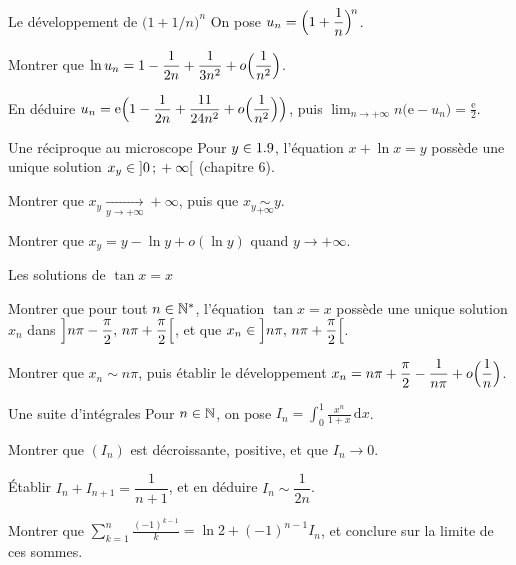 \begin{exercice}[2]{Le développement de $\bigl(1+1/n\bigr)^{n}$}
On pose $u_n=\Bigl(1+\dfrac1n\Bigr)^{\!n}$.
\begin{questions}
  \item Montrer que
    $\ln u_n=1-\dfrac{1}{2n}+\dfrac{1}{3n^{2}}+o\Bigl(\dfrac{1}{n^{2}}\Bigr)$.
  \item En déduire
    $u_n=\mathrm{e}\Bigl(1-\dfrac{1}{2n}+\dfrac{11}{24n^{2}}+o\Bigl(\dfrac{1}{n^{2}}\Bigr)\Bigr)$,
    puis $\displaystyle\lim_{n\to+\infty}n\bigl(\mathrm{e}-u_n\bigr)=\frac{\mathrm{e}}{2}$.
\end{questions}
\end{exercice}

\begin{exercice}[2]{Une réciproque au microscope}
Pour $y\in1.9$, l'équation $x+\ln x=y$ possède une unique solution
$x_y\in\mathopen{]}0\,{;}\,+\infty\mathclose{[}$ (chapitre 6).
\begin{questions}
  \item Montrer que $x_y\xrightarrow[y\to+\infty]{}+\infty$, puis que
    $x_y\underset{+\infty}{\sim}y$.
  \item Montrer que $x_y=y-\ln y+o(\ln y)$ quand $y\to+\infty$.
\end{questions}
\end{exercice}

\begin{exercice}[2]{Les solutions de $\tan x=x$}
\begin{questions}
  \item Montrer que pour tout $n\in\mathbb{N}^{*}$, l'équation $\tan x=x$ possède
    une unique solution $x_n$ dans
    $\Bigl]n\pi-\dfrac{\pi}{2},\,n\pi+\dfrac{\pi}{2}\Bigr[$, et que
    $x_n\in\Bigl]n\pi,\,n\pi+\dfrac{\pi}{2}\Bigr[$.
  \item Montrer que $x_n\sim n\pi$, puis établir le développement
    $x_n=n\pi+\dfrac{\pi}{2}-\dfrac{1}{n\pi}+o\Bigl(\dfrac1n\Bigr)$.
\end{questions}
\end{exercice}

\begin{exercice}[2]{Une suite d'intégrales}
Pour $n\in\mathbb{N}$, on pose $I_n=\displaystyle\int_{0}^{1}\frac{x^{n}}{1+x}\,\mathrm{d}x$.
\begin{questions}
  \item Montrer que $(I_n)$ est décroissante, positive, et que $I_n\to0$.
  \item Établir $I_n+I_{n+1}=\dfrac{1}{n+1}$, et en déduire
    $I_n\sim\dfrac{1}{2n}$.
  \item Montrer que
    $\displaystyle\sum_{k=1}^{n}\frac{(-1)^{k-1}}{k}=\ln2+(-1)^{n-1}I_n$,
    et conclure sur la limite de ces sommes.
\end{questions}
\end{exercice}

